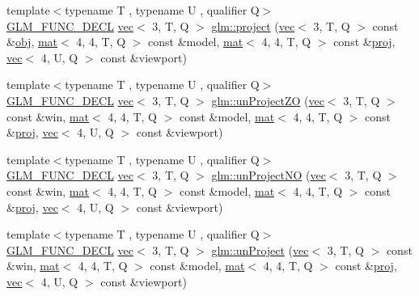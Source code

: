 \begin{DoxyCompactItemize}
\item 
{\footnotesize template$<$typename T , typename U , qualifier Q$>$ }\\\hyperlink{setup_8hpp_ab2d052de21a70539923e9bcbf6e83a51}{G\+L\+M\+\_\+\+F\+U\+N\+C\+\_\+\+D\+E\+CL} \hyperlink{structglm_1_1vec}{vec}$<$ 3, T, Q $>$ \hyperlink{group__gtc__matrix__transform_gaf36e96033f456659e6705472a06b6e11}{glm\+::project} (\hyperlink{structglm_1_1vec}{vec}$<$ 3, T, Q $>$ const \&\hyperlink{_s_d_l__opengl__glext_8h_a0c0d4701a6c89f4f7f0640715d27ab26}{obj}, \hyperlink{structglm_1_1mat}{mat}$<$ 4, 4, T, Q $>$ const \&model, \hyperlink{structglm_1_1mat}{mat}$<$ 4, 4, T, Q $>$ const \&\hyperlink{group__gtx__projection_ga58384b7170801dd513de46f87c7fb00e}{proj}, \hyperlink{structglm_1_1vec}{vec}$<$ 4, U, Q $>$ const \&viewport)
\item 
{\footnotesize template$<$typename T , typename U , qualifier Q$>$ }\\\hyperlink{setup_8hpp_ab2d052de21a70539923e9bcbf6e83a51}{G\+L\+M\+\_\+\+F\+U\+N\+C\+\_\+\+D\+E\+CL} \hyperlink{structglm_1_1vec}{vec}$<$ 3, T, Q $>$ \hyperlink{group__gtc__matrix__transform_gade5136413ce530f8e606124d570fba32}{glm\+::un\+Project\+ZO} (\hyperlink{structglm_1_1vec}{vec}$<$ 3, T, Q $>$ const \&win, \hyperlink{structglm_1_1mat}{mat}$<$ 4, 4, T, Q $>$ const \&model, \hyperlink{structglm_1_1mat}{mat}$<$ 4, 4, T, Q $>$ const \&\hyperlink{group__gtx__projection_ga58384b7170801dd513de46f87c7fb00e}{proj}, \hyperlink{structglm_1_1vec}{vec}$<$ 4, U, Q $>$ const \&viewport)
\item 
{\footnotesize template$<$typename T , typename U , qualifier Q$>$ }\\\hyperlink{setup_8hpp_ab2d052de21a70539923e9bcbf6e83a51}{G\+L\+M\+\_\+\+F\+U\+N\+C\+\_\+\+D\+E\+CL} \hyperlink{structglm_1_1vec}{vec}$<$ 3, T, Q $>$ \hyperlink{group__gtc__matrix__transform_gae089ba9fc150ff69c252a20e508857b5}{glm\+::un\+Project\+NO} (\hyperlink{structglm_1_1vec}{vec}$<$ 3, T, Q $>$ const \&win, \hyperlink{structglm_1_1mat}{mat}$<$ 4, 4, T, Q $>$ const \&model, \hyperlink{structglm_1_1mat}{mat}$<$ 4, 4, T, Q $>$ const \&\hyperlink{group__gtx__projection_ga58384b7170801dd513de46f87c7fb00e}{proj}, \hyperlink{structglm_1_1vec}{vec}$<$ 4, U, Q $>$ const \&viewport)
\item 
{\footnotesize template$<$typename T , typename U , qualifier Q$>$ }\\\hyperlink{setup_8hpp_ab2d052de21a70539923e9bcbf6e83a51}{G\+L\+M\+\_\+\+F\+U\+N\+C\+\_\+\+D\+E\+CL} \hyperlink{structglm_1_1vec}{vec}$<$ 3, T, Q $>$ \hyperlink{group__gtc__matrix__transform_ga36641e5d60f994e01c3d8f56b10263d2}{glm\+::un\+Project} (\hyperlink{structglm_1_1vec}{vec}$<$ 3, T, Q $>$ const \&win, \hyperlink{structglm_1_1mat}{mat}$<$ 4, 4, T, Q $>$ const \&model, \hyperlink{structglm_1_1mat}{mat}$<$ 4, 4, T, Q $>$ const \&\hyperlink{group__gtx__projection_ga58384b7170801dd513de46f87c7fb00e}{proj}, \hyperlink{structglm_1_1vec}{vec}$<$ 4, U, Q $>$ const \&viewport)

\end{DoxyCompactItemize}
